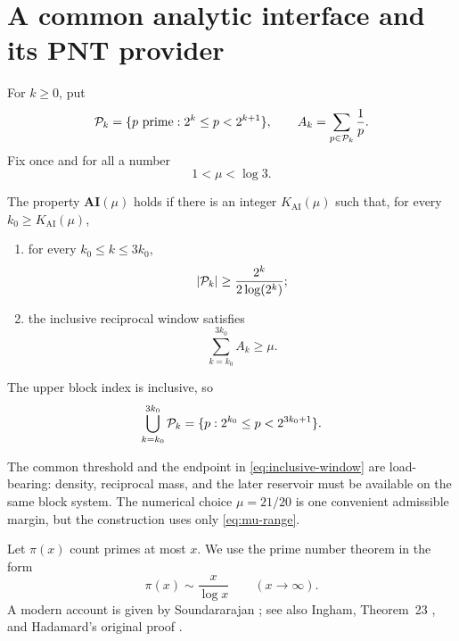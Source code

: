 \section{A common analytic interface and its PNT provider}\label{sec:analytic}

For $k\ge0$, put
\[
 \mathcal P_k=\{p\text{ prime}:2^k\le p<2^{k+1}\},
 \qquad
 A_k=\sum_{p\in\mathcal P_k}\frac1p.
\]
Fix once and for all a number
\begin{equation}\label{eq:mu-range}
 1<\mu<\log3.
\end{equation}

\begin{definition}\label{def:AI}
The property $\mathbf{AI}(\mu)$ holds if there is an integer $K_{\mathrm{AI}}(\mu)$
such that, for every $k_0\ge K_{\mathrm{AI}}(\mu)$,
\begin{enumerate}[label=(\alph*)]
\item for every $k_0\le k\le3k_0$,
\begin{equation}\label{eq:AI-density}
 |\mathcal P_k|\ge\frac{2^k}{2\log(2^k)};
\end{equation}
\item the inclusive reciprocal window satisfies
\begin{equation}\label{eq:AI-mass}
 \sum_{k=k_0}^{3k_0}A_k\ge\mu.
\end{equation}
\end{enumerate}
The upper block index is inclusive, so
\begin{equation}\label{eq:inclusive-window}
 \bigcup_{k=k_0}^{3k_0}\mathcal P_k
 =\{p:2^{k_0}\le p<2^{3k_0+1}\}.
\end{equation}
\end{definition}

The common threshold and the endpoint in \eqref{eq:inclusive-window} are
load-bearing: density, reciprocal mass, and the later reservoir must be available
on the same block system.  The numerical choice $\mu=21/20$ is one convenient
admissible margin, but the construction uses only \eqref{eq:mu-range}.

Let $\pi(x)$ count primes at most $x$.  We use the prime number theorem in the
form
\begin{equation}\label{eq:PNT}
 \pi(x)\sim\frac{x}{\log x}\qquad(x\to\infty).
\end{equation}
A modern account is given by Soundararajan \cite{Soundararajan2006}; see also
Ingham, Theorem~23 \cite{Ingham1990}, and Hadamard's original proof
\cite{Hadamard1896}.

